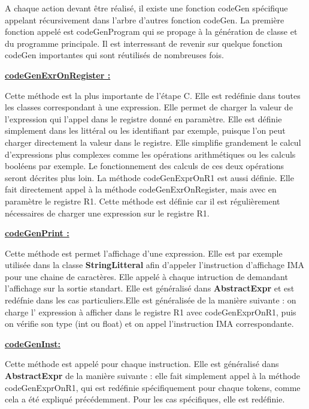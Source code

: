 \documentclass[12pt, a4paper, one side]{article}
\begin{document}
    A chaque action devant être réalisé, il existe une fonction codeGen
    spécifique appelant récursivement dans l'arbre
    d'autres fonction codeGen. La première fonction appelé est codeGenProgram
    qui se propage à la génération de classe
    et du programme principale. Il est interressant de revenir sur quelque
    fonction codeGen importantes qui sont réutilisés
    de nombreuses fois.

    \medskip
    \textbf{\underline{codeGenExrOnRegister :}}

    Cette méthode est la plus importante de l'étape C. Elle est redéfinie dans
    toutes les classes correspondant à une expression. Elle permet de charger
    la valeur de l'expression qui l'appel dans le registre donné en paramètre.
    Elle est définie simplement dans les littéral ou les identifiant par
    exemple, puisque l'on peut charger directement la valeur dans le registre.
    Elle simplifie grandement le calcul d'expressions plus complexes comme
    les opérations arithmétiques ou les calculs booléens par exemple. Le
    fonctionnement
    des calculs de ces deux opérations seront décrites plus loin. La méthode
    codeGenExprOnR1 est aussi définie. Elle fait directement appel à la méthode
    codeGenExrOnRegister, mais avec en paramètre le registre R1. Cette méthode
    est définie car il est régulièrement nécessaires de charger une expression
    sur le registre R1.

    \medskip
    \textbf{\underline{codeGenPrint :}}

    Cette méthode est permet l'affichage d'une expression. Elle est par exemple
    utilisée dans la classe \textbf{StringLitteral} afin d'appeler l'instruction
    d'affichage IMA pour une chaine de caractères. Elle appelé à chaque
    intruction de demandant l'affichage sur la sortie standart. Elle est
    généralisé dans \textbf{AbstractExpr} et est redéfnie dans les cas
    particuliers.Elle est généralisée de la manière suivante : on charge l'
    expression à afficher dans le registre R1 avec codeGenExprOnR1, puis
    on vérifie son type (int ou float) et on appel l'instruction IMA
    correspondante.

    \medskip
    \textbf{\underline{codeGenInst:}}

    Cette méthode est appelé pour chaque instruction. Elle est généralisé dans
    \textbf{AbstractExpr} de la manière suivante : elle fait simplement appel
    à la méthode codeGenExprOnR1, qui est redéfinie spécifiquement pour chaque
    tokens, comme cela a été expliqué précédemment. Pour les cas spécifiques,
    elle est redéfinie.
\end{document}
